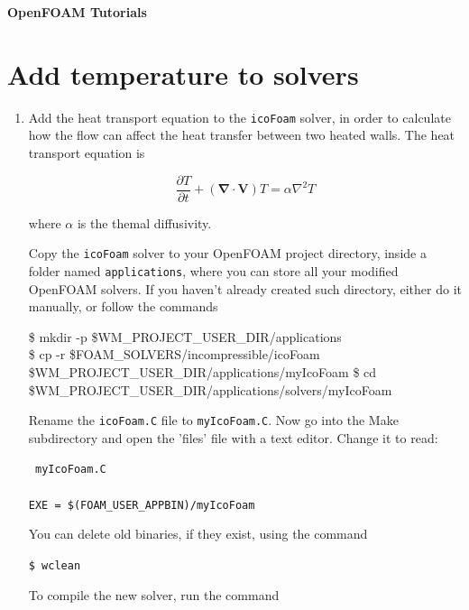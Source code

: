 \documentclass{article}
\newcommand\tab[1][0.5cm]{\hspace*{#1}}
\begin{document}
	

\noindent
\begin{huge}
\hspace{-3.0mm}\textbf{OpenFOAM Tutorials}
\end{huge}

\setcounter{section}{1}
\section{Add temperature to solvers}
	
\begin{enumerate}[2.1]
	\item Add  the heat transport equation to the {\tt icoFoam} solver, in order to calculate how the flow can affect the heat transfer between two heated walls. The heat transport equation is
	
	$$
	\dfrac{\partial T}{\partial t} + (\bm{\nabla}\cdot \bm{V}) T = \alpha \nabla^2 T
	$$

	where $\alpha$ is the themal diffusivity.
	
	Copy the {\tt icoFoam} solver to your OpenFOAM project directory, inside a folder named {\tt applications}, where you can store all your modified OpenFOAM solvers. If you haven't already created such directory, either do it manually, or follow the commands
	
	{\tt
		
	\tab	\$ mkdir -p \$WM\_PROJECT\_USER\_DIR/applications \\
	\tab 	\$ cp -r \$FOAM\_SOLVERS/incompressible/icoFoam \$WM\_PROJECT\_USER\_DIR/applications/myIcoFoam
	\tab \$ cd \$WM\_PROJECT\_USER\_DIR/applications/solvers/myIcoFoam
	}
	
	\vspace{0.2cm}
	
	Rename the {\tt icoFoam.C} file to {\tt myIcoFoam.C}. Now go into the Make subdirectory and open the 'files' file with a text editor. Change it to read: 


	\begin{myframe}
	{\tt %
	 myIcoFoam.C \\%
	 \\%
	 EXE = \$(FOAM\_USER\_APPBIN)/myIcoFoam}
 	\end{myframe}


	You can delete old binaries, if they exist, using the command
	
	{\tt \tab \$ wclean}
	
	To compile the new solver, run the command
	

\end{enumerate}
\end{document}
